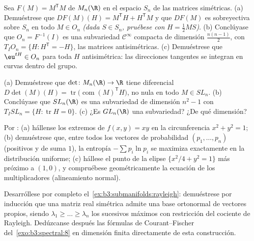 \begin{exercise}[$\star\star$]\label{exo:b3:submanifolds:5}
Sea $F(M) = M^{\mathsf T}M$ de $M_n(\R)$ en el espacio $S_n$ de las
matrices simétricas. (a) Demuéstrese que
$DF(M)(H) = M^{\mathsf T}H + H^{\mathsf T}M$ y que $DF(M)$ es
sobreyectiva sobre $S_n$ en todo $M \in O_n$ \emph{(dada $S \in S_n$,
pruébese con $H = \frac12MS$)}. (b) Conclúyase que $O_n = F^{-1}(I)$ es
una subvariedad $\mathcal C^\infty$
compacta de dimensión
$\frac{n(n-1)}2$, con $T_IO_n = \{H : H^{\mathsf T} = -H\}$, las
matrices antisimétricas. (c) Demuéstrese que $\eu^{tH} \in O_n$ para
toda $H$ antisimétrica: las direcciones tangentes se integran en curvas
dentro del grupo.
\end{exercise}

\begin{exercise}[$\star\star$]\label{exo:b3:submanifolds:6}
(a) Demuéstrese que $\det \colon M_n(\R) \to \R$ tiene diferencial
$D\det(M)(H) = \operatorname{tr}\bigl(\operatorname{com}(M)
^{\mathsf T}H\bigr)$, no nula en todo $M \in SL_n$. (b) Conclúyase que
$SL_n(\R)$ es una subvariedad de dimensión $n^2 - 1$ con
$T_ISL_n = \{H : \operatorname{tr}H = 0\}$. (c) ¿Es $GL_n(\R)$ una
subvariedad? ¿De qué dimensión?
\end{exercise}

\begin{exercise}[$\star\star$]\label{exo:b3:submanifolds:7}
Por :
(a) hállense los extremos de $f(x,y) = xy$ en la circunferencia $x^2 +
y^2 = 1$; (b) demuéstrese que, entre todos los vectores de probabilidad
$(p_1, \dots,
p_n)$ (positivos y de suma $1$), la entropía $-\sum
p_i\ln p_i$ se maximiza exactamente en la distribución uniforme; (c)
hállese el punto de la elipse $\{x^2/4 + y^2 = 1\}$ más próximo a
$(1, 0)$, y compruébese geométricamente la ecuación de los
multiplicadores (alineamiento normal).
\end{exercise}

\begin{exercise}[$\star\star\star$]\label{exo:b3:submanifolds:8}
Desarróllese por completo el~\cref{ex:b3:submanifolds:rayleigh}:
demuéstrese por inducción que una matriz real simétrica admite una base
ortonormal de vectores propios, siendo
$\lambda_1 \geq \dots \geq \lambda_n$ los sucesivos máximos con
restricción del cociente de Rayleigh. Dedúzcanse después las fórmulas de
Courant--Fischer del~\cref{exo:b3:spectral:8} en dimensión finita
directamente de esta construcción.
\end{exercise}

